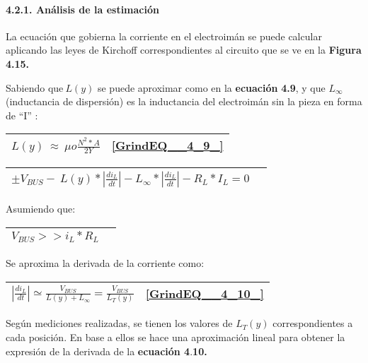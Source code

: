 \paragraph{4.2.1. An\'{a}lisis de la estimaci\'{o}n}

\noindent La ecuaci\'{o}n que gobierna la corriente en el electroim\'{a}n se puede calcular aplicando las leyes de Kirchoff correspondientes al circuito que se ve en la \textbf{Figura 4.15.}


\noindent 

\noindent Sabiendo que$\ L(y)$ se puede aproximar como en la \textbf{ecuaci\'{o}n} \textbf{4.9}, y que $L_{\infty }$(inductancia de dispersi\'{o}n) es la inductancia del electroim\'{a}n sin la pieza en forma de ``I'' :

\noindent 

\begin{tabular}{|p{3.9in}|p{0.4in}|} \hline 
$L(y)\ \approx \ \mu o\frac{N^2*A}{2Y}$ & \eqref{GrindEQ__4_9_}  \\ \hline 
\end{tabular}



\begin{tabular}{|p{3.9in}|p{0.4in}|} \hline 
$\pm V_{BUS}-\ L(y)*\left|\frac{{di}_L}{dt}\right|-L_{\infty }*\left|\frac{{di}_L}{dt}\right|-R_L*I_L=0$ &  \\ \hline 
\end{tabular}



\noindent Asumiendo que:

 

\begin{tabular}{|p{3.9in}|p{0.4in}|} \hline 
$V_{BUS}>>i_L*R_L$ &  \\ \hline 
\end{tabular}



\noindent Se aproxima la derivada de la corriente como:

\noindent 

\begin{tabular}{|p{3.9in}|p{0.4in}|} \hline 
$\left|\frac{{di}_L}{dt}\right|\simeq \frac{V_{BUS}}{L(y)+L_{\infty }}=\frac{V_{BUS}}{L_T(y)}$ & \eqref{GrindEQ__4_10_}  \\ \hline 
\end{tabular}



\noindent Seg\'{u}n mediciones realizadas, se tienen los valores de $L_T(y)$ correspondientes a cada posici\'{o}n. En base a ellos se hace una aproximaci\'{o}n lineal para obtener la expresi\'{o}n de la derivada de la \textbf{ecuaci\'{o}n 4}.\textbf{10.}


